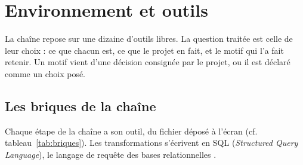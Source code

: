 
%

\chapter{Environnement et outils}\label{chap:outils}

La chaîne repose sur une dizaine d'outils libres. La question traitée est celle de leur choix : ce
que chacun est, ce que le projet en fait, et le motif qui l'a fait retenir. Un motif vient d'une
décision consignée par le projet, ou il est déclaré comme un choix posé.

\section{Les briques de la chaîne}

Chaque étape de la chaîne a son outil, du fichier déposé à l'écran (cf. tableau~\ref{tab:briques}).
Les transformations s'écrivent en SQL (\emph{Structured Query Language}), le langage de requête des
bases relationnelles \cite{s38}.

